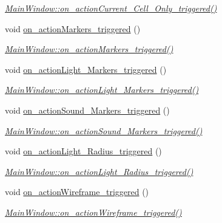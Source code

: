 \begin{DoxyCompactItemize}
\begin{DoxyCompactList}\small\item\em \hyperlink{class_main_window_a58acaabf35d71b094d373c5a8f4f333a}{Main\+Window\+::on\+\_\+action\+Current\+\_\+\+Cell\+\_\+\+Only\+\_\+triggered()} \end{DoxyCompactList}\item 
void \hyperlink{class_main_window_addae5ed0b02101880ff1907c4b2c5864}{on\+\_\+action\+Markers\+\_\+triggered} ()
\begin{DoxyCompactList}\small\item\em \hyperlink{class_main_window_addae5ed0b02101880ff1907c4b2c5864}{Main\+Window\+::on\+\_\+action\+Markers\+\_\+triggered()} \end{DoxyCompactList}\item 
void \hyperlink{class_main_window_a761bc0d259399f5ddb9df53b0435e1d9}{on\+\_\+action\+Light\+\_\+\+Markers\+\_\+triggered} ()
\begin{DoxyCompactList}\small\item\em \hyperlink{class_main_window_a761bc0d259399f5ddb9df53b0435e1d9}{Main\+Window\+::on\+\_\+action\+Light\+\_\+\+Markers\+\_\+triggered()} \end{DoxyCompactList}\item 
void \hyperlink{class_main_window_a4b49e5d0db6f503d31748bf48c3179e7}{on\+\_\+action\+Sound\+\_\+\+Markers\+\_\+triggered} ()
\begin{DoxyCompactList}\small\item\em \hyperlink{class_main_window_a4b49e5d0db6f503d31748bf48c3179e7}{Main\+Window\+::on\+\_\+action\+Sound\+\_\+\+Markers\+\_\+triggered()} \end{DoxyCompactList}\item 
void \hyperlink{class_main_window_a05175ca29c0d327277b1642d1e974e66}{on\+\_\+action\+Light\+\_\+\+Radius\+\_\+triggered} ()
\begin{DoxyCompactList}\small\item\em \hyperlink{class_main_window_a05175ca29c0d327277b1642d1e974e66}{Main\+Window\+::on\+\_\+action\+Light\+\_\+\+Radius\+\_\+triggered()} \end{DoxyCompactList}\item 
void \hyperlink{class_main_window_a96b669e857f9f600d938cc735632da04}{on\+\_\+action\+Wireframe\+\_\+triggered} ()
\begin{DoxyCompactList}\small\item\em \hyperlink{class_main_window_a96b669e857f9f600d938cc735632da04}{Main\+Window\+::on\+\_\+action\+Wireframe\+\_\+triggered()} \end{DoxyCompactList}\item 

\end{DoxyCompactItemize}

